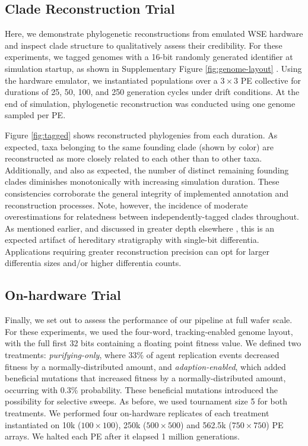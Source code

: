 \subsection{Clade Reconstruction Trial}

Here, we demonstrate phylogenetic reconstructions from emulated WSE hardware and inspect clade structure to qualitatively assess their credibility.
For these experiments, we tagged genomes with a 16-bit randomly generated identifier at simulation startup, as shown in Supplementary Figure \ref{fig:genome-layout} \citep{moreno2024supplement}.
Using the hardware emulator, we instantiated populations over a $3\times3$ PE collective for durations of 25, 50, 100, and 250 generation cycles under drift conditions.
At the end of simulation, phylogenetic reconstruction was conducted using one genome sampled per PE.



Figure \ref{fig:tagged} shows reconstructed phylogenies from each duration.
As expected, taxa belonging to the same founding clade (shown by color) are reconstructed as more closely related to each other than to other taxa.
Additionally, and also as expected, the number of distinct remaining founding clades diminishes monotonically with increasing simulation duration.
These consistencies corroborate the general integrity of implemented annotation and reconstruction processes.
Note, however, the incidence of moderate overestimations for relatedness between independently-tagged clades throughout.
As mentioned earlier, and discussed in greater depth elsewhere \citep{moreno2024guide}, this is an expected artifact of hereditary stratigraphy with single-bit differentia.
Applications requiring greater reconstruction precision can opt for larger differentia sizes and/or higher differentia counts.

\subsection{On-hardware Trial}



Finally, we set out to assess the performance of our pipeline at full wafer scale.
For these experiments, we used the four-word, tracking-enabled genome layout, with the full first 32 bits containing a floating point fitness value.
We defined two treatments: \textit{purifying-only}, where 33\% of agent replication events decreased fitness by a normally-distributed amount,  and \textit{adaption-enabled}, which added beneficial mutations that increased fitness by a normally-distributed amount, occurring with 0.3\% probability.
These beneficial mutations introduced the possibility for selective sweeps.
As before, we used tournament size 5 for both treatments.
We performed four on-hardware replicates of each treatment instantiated on 10k ($100\times100$), 250k ($500\times500$) and 562.5k ($750\times750$) PE arrays.
We halted each PE after it elapsed 1 million generations.

